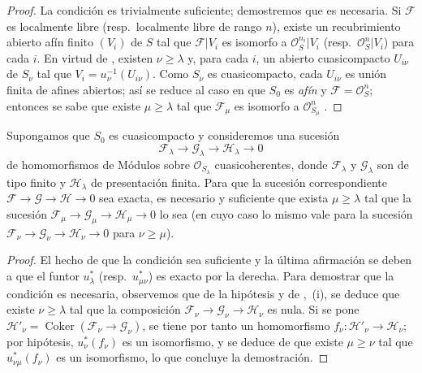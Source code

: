 \begin{proof}
La condición es trivialmente suficiente; demostremos que es necesaria.
Si $\mathcal F$ es localmente libre (resp.\ localmente libre de rango $n$), existe un recubrimiento abierto afín finito $(V_i)$ de $S$ tal que $\mathcal F|V_i$ es isomorfo a $\mathcal O_S^{n_i}|V_i$ (resp.\ $\mathcal O_S^n|V_i$) para cada $i$.
En virtud de , existen $\nu\geq\lambda$ y, para cada $i$, un abierto cuasicompacto $U_{i\nu}$ de $S_\nu$ tal que $V_i=u_\nu^{-1}(U_{i\nu})$.
Como $S_\nu$ es cuasicompacto, cada $U_{i\nu}$ es unión finita de afines abiertos; así se reduce al caso en que $S_0$ es \emph{afín} y $\mathcal F=\mathcal O_S^n$; entonces se sabe que existe $\mu\geq\lambda$ tal que $\mathcal F_\mu$ es isomorfo a $\mathcal O_{S_\mu}^n$ .
\end{proof}

\begin{proposition}[8.5.6]
\label{IV.8.5.6-fr}
Supongamos que $S_0$ es cuasicompacto y consideremos una sucesión
\[
  \mathcal F_\lambda\longrightarrow\mathcal G_\lambda
  \longrightarrow\mathcal H_\lambda\longrightarrow0
\]
de homomorfismos de Módulos sobre $\mathcal O_{S_\lambda}$ cuasicoherentes, donde $\mathcal F_\lambda$ y $\mathcal G_\lambda$ son de tipo finito y $\mathcal H_\lambda$ de presentación finita.
Para que la sucesión correspondiente $\mathcal F\to\mathcal G\to\mathcal H\to0$ sea exacta, es necesario y suficiente que exista $\mu\geq\lambda$ tal que la sucesión $\mathcal F_\mu\to\mathcal G_\mu\to\mathcal H_\mu\to0$ lo sea (en cuyo caso lo mismo vale para la sucesión $\mathcal F_\nu\to\mathcal G_\nu\to\mathcal H_\nu\to0$ para $\nu\geq\mu$).
\end{proposition}

\begin{proof}
El hecho de que la condición sea suficiente y la última afirmación se deben a que el funtor $u_\lambda^*$ (resp.\ $u_{\mu\nu}^*$) es exacto por la derecha.
Para demostrar que la condición es necesaria, observemos que de la hipótesis y de ,~(i), se deduce que existe $\nu\geq\lambda$ tal que la composición $\mathcal F_\nu\to\mathcal G_\nu\to\mathcal H_\nu$ es nula.
Si se pone $\mathcal H'_\nu=\operatorname{Coker}(\mathcal F_\nu\to\mathcal G_\nu)$, se tiene por tanto un homomorfismo $f_\nu:\mathcal H'_\nu\to\mathcal H_\nu$; por hipótesis, $u_\nu^*(f_\nu)$ es un isomorfismo, y se deduce de  que existe $\mu\geq\nu$ tal que $u_{\nu\mu}^*(f_\nu)$ es un isomorfismo, lo que concluye la demostración.
\end{proof}

